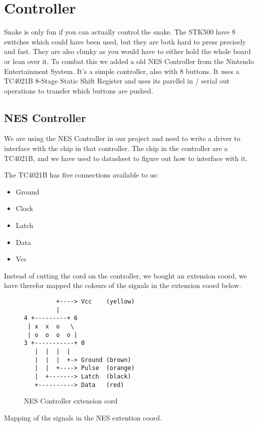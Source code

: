 \section{Controller}

Snake is only fun if you can actually control the snake. The STK500 have 8 switches which could have been used, but they are both hard to press precisely and fast. They are also clunky as you would have to either hold the whole board or lean over it. To combat this we added a old NES Controller from the Nintendo Entertainment System. It's a simple controller, also with 8 buttons. It uses a TC4021B 8-Stage Static Shift Register and uses its parellel in / serial out operations to transfer which buttons are pushed.

\subsection{NES Controller}

We are using the NES Controller in our project and need to write a driver to interface with the chip in that controller.
The chip in the controller are a TC4021B, and we have used to datasheet\cite{toshiba:tc4021b} to figure out how to interface with it.

The TC4021B has five connections available to us:
\begin{itemize}
\item Ground
\item Clock
\item Latch
\item Data
\item Vcc
\end{itemize}

Instead of cutting the cord on the controller, we bought an extension coord, we have therefor mapped the colours of the signals in the extension coord below.

\begin{figure}
\centering
\begin{BVerbatim}
         +----> Vcc    (yellow)
         |
4 +---------+ 6
 | x  x  o   \
 | o  o  o  o |
3 +-----------+ 0
   |  |  |  |
   |  |  |  +-> Ground (brown)
   |  |  +----> Pulse  (orange)
   |  +-------> Latch  (black)
   +----------> Data   (red)
\end{BVerbatim}
\caption{NES Controller extension cord}
\label{fig:nes}
\end{figure}

Mapping of the signals in the NES extention coord.

